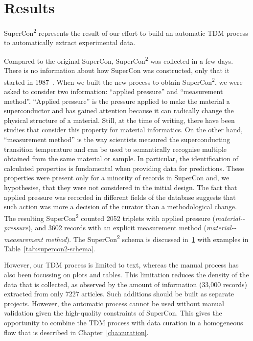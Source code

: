 \section{Results}
\label{sec:results-supercon2}

SuperCon\textsuperscript{2} represents the result of our effort to build an automatic TDM process to automatically extract experimental data. 

Compared to the original SuperCon, SuperCon\textsuperscript{2} was collected in a few days. There is no information about how SuperCon was constructed, only that it started in 1987~\cite{ishii2023structuring}. 
When we built the new process to obtain SuperCon\textsuperscript{2}, we were asked to consider two information: ``applied pressure'' and ``measurement method''. 
``Applied pressure'' is the pressure applied to make the material a superconductor and has gained attention because it can radically change the physical structure of a material. Still, at the time of writing, there have been studies that consider this property for material informatics. 
On the other hand, ``measurement method'' is the way scientists measured the superconducting transition temperature \tc and can be used to semantically recognise multiple \tc obtained from the same material or sample. In particular, the identification of calculated properties is fundamental when providing data for predictions. 
These properties were present only for a minority of records in SuperCon and, we hypothesise, that they were not considered in the initial design. The fact that applied pressure was recorded in different fields of the database suggests that such action was more a decision of the curator than a methodological change.
The resulting SuperCon\textsuperscript{2} counted 2052 triplets with applied pressure (\textit{material-\tc-pressure}), and 3602 records with an explicit measurement method (\textit{material-\tc-measurement method}).
The SuperCon\textsuperscript{2} schema is discussed in~\ref{sec:results-supercon2} with examples in Table~\ref{tab:supercon2-schema}. 

However, our TDM process is limited to text, whereas the manual process has also been focussing on plots and tables. This limitation reduces the density of the data that is collected, as observed by the amount of information (33,000 records) extracted from only 7227 articles. Such additions should be built as separate projects.
However, the automatic process cannot be used without manual validation given the high-quality constraints of SuperCon. This gives the opportunity to combine the TDM process with data curation in a homogeneous flow that is described in Chapter~\ref{cha:curation}.

